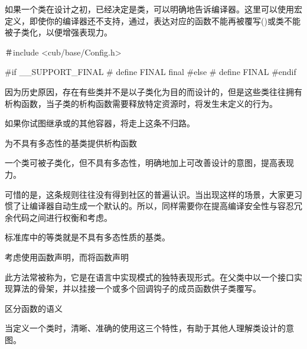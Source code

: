 \begin{content}
如果一个类在设计之初，已经决定是类，可以明确地告诉编译器。这里可以使用宏定义，即使你的编译器还不支持\cpp{}，通过，表达对应的函数不能再被覆写()或类不能被子类化，以便增强表现力。

\begin{leftbar}
\begin{c++}
＃include <cub/base/Config.h>

#if __SUPPORT_FINAL
# define FINAL final
#else
# define FINAL
#endif
\end{c++}
\end{leftbar}

因为历史原因，存在有些类并不是以子类化为目的而设计的，但是这些类往往拥有析构函数，当子类的析构函数需要释放特定资源时，将发生未定义的行为。

如果你试图继承或的其他容器，将走上这条不归路。

\begin{regulation}
为不具有多态性的基类提供析构函数
\end{regulation}

一个类可被子类化，但不具有多态性，明确地加上可改善设计的意图，提高表现力。

可惜的是，这条规则往往没有得到社区的普遍认识。当出现这样的场景，大家更习惯了让编译器自动生成一个默认的。所以，同样需要你在提高编译安全性与容忍冗余代码之间进行权衡和考虑。

标准库中的等类就是不具有多态性质的基类。

\begin{regulation}
考虑使用函数声明，而将函数声明
\end{regulation}

此方法常被称为，它是在\cpp{}语言中实现模式的独特表现形式。在父类中以一个接口实现算法的骨架，并以挂接一个或多个回调钩子的成员函数供子类覆写。

\begin{regulation}
区分函数的语义
\end{regulation}

当定义一个类时，清晰、准确的使用这三个特性，有助于其他人理解类设计的意图。


\end{content}

